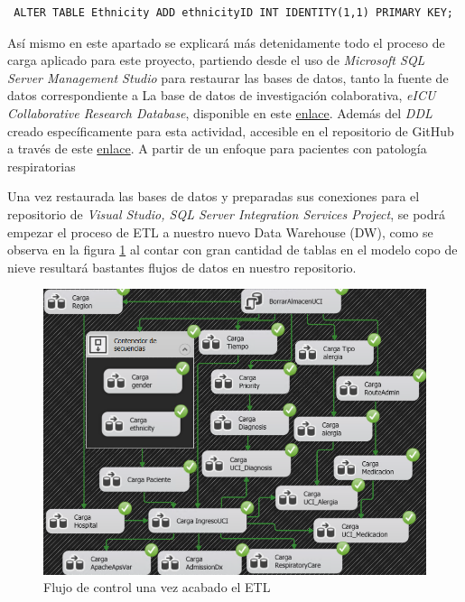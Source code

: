 \documentclass[12pt, a4paper, twoside]{article}
\begin{document}
	\begin{verbatim} ALTER TABLE Ethnicity ADD ethnicityID INT IDENTITY(1,1) PRIMARY KEY; 
	\end{verbatim}
	
	
	Así mismo en este apartado se explicará más detenidamente todo el proceso de carga aplicado para este proyecto, partiendo desde el uso de \textit{Microsoft SQL Server Management Studio} para restaurar las bases de datos, tanto la fuente de datos correspondiente a La base de datos de investigación colaborativa, \textit{eICU Collaborative Research Database}, disponible en este \href{https://uma365-my.sharepoint.com/:u:/g/personal/rmluque_uma_es/EebuEtDjp8VImt-_PhweiZMBu1_7XkPqZHkD74iGgg0fXQ?e=lOivcI}{enlace}. Además del \textit{DDL} creado específicamente para esta actividad, accesible en el repositorio de GitHub a través de este \href{https://github.com/Diegodepab/almacen_UCI_Sanitaria/blob/main/ETL/base_de_datos.ddl}{enlace}. A partir de un enfoque para pacientes con patología respiratorias 
	
	Una vez restaurada las bases de datos y preparadas sus conexiones para el repositorio de \textit{Visual Studio, SQL Server Integration Services Project}, se podrá empezar el proceso de ETL a nuestro nuevo Data Warehouse (DW), como se observa en la figura \ref{fig:2} al contar con gran cantidad de tablas en el modelo copo de nieve resultará bastantes flujos de datos en nuestro repositorio.
	
	
	\begin{figure}[H]
		\centering
		\includegraphics[width=1\textwidth]{image/100_ETL_ejecutandose.png}
		\caption{Flujo de control una vez acabado el ETL}
		\label{fig:2}
	\end{figure}
	
\end{document}
